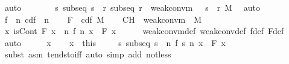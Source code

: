 \documentclass{article}
\theoremstyle{definition}
\begin{document}
\begin{isabellebody}
\ auto\isanewline
\ \ \isacommand{{\isacharbraceright}}\isamarkupfalse%
\isanewline
\ \ \isamarkupfalse%
\ {\isacharasterisk}{\isacharcolon}\ {\isachardoublequoteopen}{\isasymAnd}s{\isachardot}\ subseq\ s\ {\isasymLongrightarrow}\ {\isasymexists}r{\isachardot}\ subseq\ r\ {\isasymand}\ weak{\isacharunderscore}conv{\isacharunderscore}m\ {\isacharparenleft}{\isasymmu}\ {\isasymcirc}\ {\isacharparenleft}s\ {\isasymcirc}\ r{\isacharparenright}{\isacharparenright}\ M{\isachardoublequoteclose}\ \isamarkupfalse%
\ auto\isanewline
\ \ \isamarkupfalse%
\ f\ {\isasymequiv}\ {\isachardoublequoteopen}{\isasymlambda}n{\isachardot}\ cdf\ {\isacharparenleft}{\isasymmu}\ n{\isacharparenright}{\isachardoublequoteclose}\isanewline
\ \ \isamarkupfalse%
\ F\ {\isasymequiv}\ {\isachardoublequoteopen}cdf\ M{\isachardoublequoteclose}\isanewline
\ \ \isamarkupfalse%
\ CH{\isacharcolon}\ {\isachardoublequoteopen}{\isasymnot}\ weak{\isacharunderscore}conv{\isacharunderscore}m\ {\isasymmu}\ M{\isachardoublequoteclose}\isanewline
\ \ \isamarkupfalse%
\ {\isachardoublequoteopen}{\isasymexists}x{\isachardot}\ isCont\ F\ x\ {\isasymand}\ {\isasymnot}{\isacharparenleft}{\isacharparenleft}{\isasymlambda}n{\isachardot}\ f\ n\ x{\isacharparenright}\ {\isacharminus}{\isacharminus}{\isacharminus}{\isacharminus}{\isachargreater}\ F\ x{\isacharparenright}{\isachardoublequoteclose}\isanewline
\ \ \ \ \isamarkupfalse%
\ weak{\isacharunderscore}conv{\isacharunderscore}m{\isacharunderscore}def\ weak{\isacharunderscore}conv{\isacharunderscore}def\ f{\isacharunderscore}def\ F{\isacharunderscore}def\ \isamarkupfalse%
\ auto\isanewline
\ \ \isamarkupfalse%
\ \isamarkupfalse%
\ x\ \isacommand{{\isachardot}{\isachardot}}\isamarkupfalse%
\ \isamarkupfalse%
\ x\ {\isacharequal}\ this\isanewline
\ \ \isamarkupfalse%
\ {\isachardoublequoteopen}{\isasymexists}{\isasymepsilon}{\isachargreater}{}{\isachardot}\ {\isasymexists}s{\isachardot}\ subseq\ s\ {\isasymand}\ {\isacharparenleft}{\isasymforall}n{\isachardot}\ {\isasymbar}f\ {\isacharparenleft}s\ n{\isacharparenright}\ x\ {\isacharminus}\ F\ x{\isasymbar}\ {\isasymge}\ {\isasymepsilon}{\isacharparenright}{\isachardoublequoteclose}\isanewline
\ \ \ \ \isamarkupfalse%
\ {\isacharparenleft}subst\ {\isacharparenleft}asm{\isacharparenright}\ tendsto{\isacharunderscore}iff{\isacharcomma}\ auto\ simp\ add{\isacharcolon}\ not{\isacharunderscore}less{\isacharparenright}\isanewline

\end{isabellebody}
\end{document}
